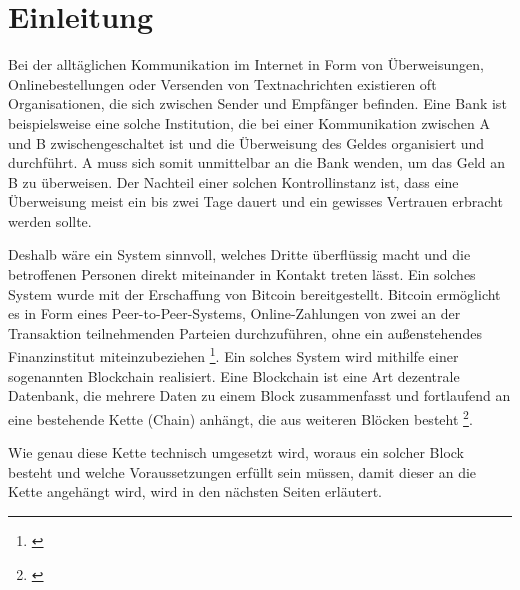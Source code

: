 \chapter{Einleitung}

 Bei der alltäglichen Kommunikation im Internet in Form von 
 Überweisungen, Onlinebestellungen oder Versenden von Textnachrichten 
 existieren oft Organisationen, die sich
 zwischen Sender und Empfänger befinden. Eine Bank ist beispielsweise eine solche Institution, die bei einer Kommunikation zwischen A und B zwischengeschaltet ist und die Überweisung des Geldes organisiert und durchführt. A muss sich somit unmittelbar an die Bank wenden, um das Geld an B zu überweisen. Der Nachteil einer solchen Kontrollinstanz ist, dass eine Überweisung meist ein bis zwei Tage dauert und ein gewisses Vertrauen erbracht werden sollte.

 Deshalb wäre ein System sinnvoll, welches Dritte überflüssig macht und die betroffenen Personen direkt miteinander in Kontakt treten lässt. Ein solches System wurde mit der Erschaffung von Bitcoin bereitgestellt. Bitcoin ermöglicht es in Form eines Peer-to-Peer-Systems, Online-Zahlungen von zwei an der Transaktion teilnehmenden Parteien durchzuführen, ohne ein außenstehendes Finanzinstitut miteinzubeziehen \footnote{\parencite{Satoshi.}}. Ein solches System wird mithilfe einer sogenannten Blockchain realisiert. Eine Blockchain ist eine Art dezentrale Datenbank, die mehrere Daten zu einem Block zusammenfasst und fortlaufend an eine bestehende Kette (Chain) anhängt, die aus weiteren Blöcken besteht \footnote{\parencite[vgl.][S. 17]{UK.}}.


Wie genau diese Kette technisch umgesetzt wird, woraus ein solcher Block besteht und welche Voraussetzungen erfüllt sein müssen, damit dieser an die Kette angehängt wird, wird in den nächsten Seiten erläutert.

